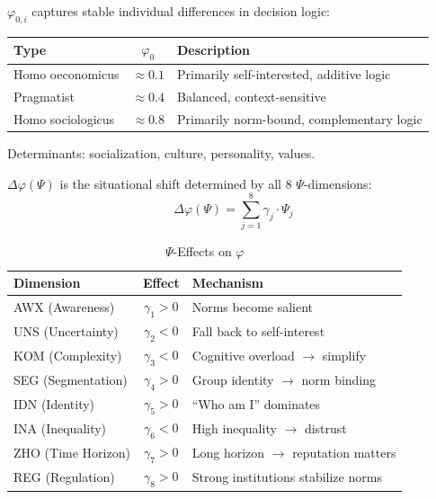 \begin{definition}
\label{def:phi-baseline}
$\varphi_{0,i}$ captures stable individual differences in decision logic:
\begin{table}[htbp]
\centering
\begin{tabular}{@{}lcp{6cm}@{}}
\toprule
\textbf{Type} & $\varphi_0$ & \textbf{Description} \\
\midrule
Homo oeconomicus & $\approx 0.1$ & Primarily self-interested, additive logic \\
Pragmatist & $\approx 0.4$ & Balanced, context-sensitive \\
Homo sociologicus & $\approx 0.8$ & Primarily norm-bound, complementary logic \\
\bottomrule
\end{tabular}
\end{table}

Determinants: socialization, culture, personality, values.
\end{definition}

\begin{definition}
\label{def:phi-context}
$\Delta\varphi(\Psi)$ is the situational shift determined by all 8 $\Psi$-dimensions:
\begin{equation}
\Delta\varphi(\Psi) = \sum_{j=1}^{8} \gamma_j \cdot \Psi_j
\end{equation}

\begin{table}[htbp]
\centering
\caption{$\Psi$-Effects on $\varphi$}
\label{tab:psi-phi-effects}
\begin{tabular}{@{}lcl@{}}
\toprule
\textbf{Dimension} & \textbf{Effect} & \textbf{Mechanism} \\
\midrule
AWX (Awareness) & $\gamma_1 > 0$ & Norms become salient \\
UNS (Uncertainty) & $\gamma_2 < 0$ & Fall back to self-interest \\
KOM (Complexity) & $\gamma_3 < 0$ & Cognitive overload $\rightarrow$ simplify \\
SEG (Segmentation) & $\gamma_4 > 0$ & Group identity $\rightarrow$ norm binding \\
IDN (Identity) & $\gamma_5 > 0$ & ``Who am I'' dominates \\
INA (Inequality) & $\gamma_6 < 0$ & High inequality $\rightarrow$ distrust \\
ZHO (Time Horizon) & $\gamma_7 > 0$ & Long horizon $\rightarrow$ reputation matters \\
REG (Regulation) & $\gamma_8 > 0$ & Strong institutions stabilize norms \\
\bottomrule
\end{tabular}
\end{table}
\end{definition}

